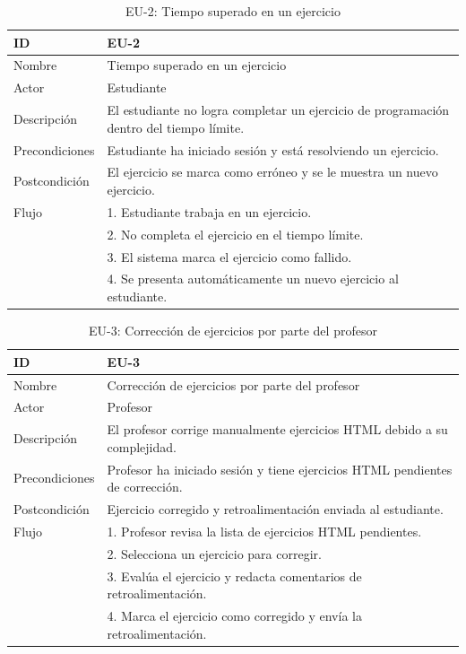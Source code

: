 \begin{table}[H]
    \centering
    \begin{tabularx}{\textwidth}{|l|X|}
    \hline
    ID & EU-2 \\
    \hline
    Nombre & Tiempo superado en un ejercicio \\
    \hline
    Actor & Estudiante \\
    \hline
    Descripción & El estudiante no logra completar un ejercicio de programación dentro del tiempo límite. \\
    \hline
    Precondiciones & Estudiante ha iniciado sesión y está resolviendo un ejercicio. \\
    \hline
    Postcondición & El ejercicio se marca como erróneo y se le muestra un nuevo ejercicio. \\
    \hline
    Flujo & 
    1. Estudiante trabaja en un ejercicio. \\
    & 2. No completa el ejercicio en el tiempo límite. \\
    & 3. El sistema marca el ejercicio como fallido. \\
    & 4. Se presenta automáticamente un nuevo ejercicio al estudiante. \\
    \hline
    \end{tabularx}
    \caption{EU-2: Tiempo superado en un ejercicio}
\end{table}

\begin{table}[H]
    \centering
    \begin{tabularx}{\textwidth}{|l|X|}
    \hline
    ID & EU-3\\
    \hline
    Nombre & Corrección de ejercicios por parte del profesor \\
    \hline
    Actor & Profesor \\
    \hline
    Descripción & El profesor corrige manualmente ejercicios HTML debido a su complejidad. \\
    \hline
    Precondiciones & Profesor ha iniciado sesión y tiene ejercicios HTML pendientes de corrección. \\
    \hline
    Postcondición & Ejercicio corregido y retroalimentación enviada al estudiante. \\
    \hline
    Flujo & 
    1. Profesor revisa la lista de ejercicios HTML pendientes. \\
    & 2. Selecciona un ejercicio para corregir. \\
    & 3. Evalúa el ejercicio y redacta comentarios de retroalimentación. \\
    & 4. Marca el ejercicio como corregido y envía la retroalimentación. \\
    \hline
    \end{tabularx}
    \caption{EU-3: Corrección de ejercicios por parte del profesor}
\end{table}

